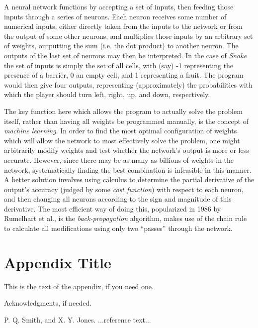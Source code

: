 \documentclass[preprint]{sigplanconf}
\begin{document}
A neural network functions by accepting a set of inputs, then feeding those inputs through a series of neurons. Each neuron receives some number of numerical inputs, either directly taken from the inputs to the network or from the output of some other neurons, and multiplies those inputs by an arbitrary set of weights, outputting the sum (i.e. the dot product) to another neuron. The outputs of the last set of neurons may then be interpreted. In the case of \textit{Snake} the set of inputs is simply the set of all cells, with (say) -1 representing the presence of a barrier, 0 an empty cell, and 1 representing a fruit. The program would then give four outputs, representing (approximately) the probabilities with which the player should turn left, right, up, and down, respectively.

The key function here which allows the program to actually solve the problem itself, rather than having all weights be programmed manually, is the concept of \textit{machine learning}. In order to find the most optimal configuration of weights which will allow the network to most effectively solve the problem, one might arbitrarily modify weights and test whether the network's output is more or less accurate. However, since there may be as many as billions of weights in the network, systematically finding the best combination is infeasible in this manner. A better solution involves using calculus to determine the partial derivative of the output's accuracy (judged by some \textit{cost function}) with respect to each neuron, and then changing all neurons according to the sign and magnitude of this derivative. The most efficient way of doing this, popularized in 1986 by Rumelhart et al., is the \textit{back-propagation} algorithm, makes use of the chain rule to calculate all modifications using only two ``passes'' through the network.

\appendix
\section{Appendix Title}

This is the text of the appendix, if you need one.

\acks

Acknowledgments, if needed.





\begin{thebibliography}{}
\softraggedright

P. Q. Smith, and X. Y. Jones. ...reference text...

\end{thebibliography}
\end{document}
